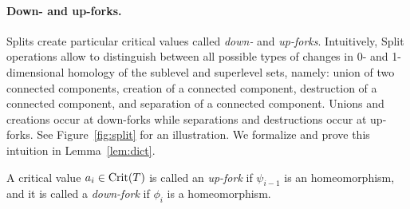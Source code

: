 \paragraph*{Down- and up-forks.} Splits create particular critical values called {\em down-} and {\em up-forks}.
Intuitively, Split operations allow to distinguish between all possible types of
changes in 0- and 1-dimensional homology of the sublevel and superlevel sets, namely: 
union of two connected components, creation of a connected component, destruction of a connected component,
and separation of a connected component. Unions and creations occur at down-forks while separations and destructions occur at up-forks.
See Figure~\ref{fig:split} for an illustration. We formalize and prove this intuition in Lemma~\ref{lem:dict}.

\begin{defin}
A critical value $a_i\in\mathrm{Crit}(T)$ is called an \emph{up-fork} if $\psi_{i-1}$ is an homeomorphism, and
it is called a \emph{down-fork} if $\phi_i$ is a homeomorphism.
\end{defin}

